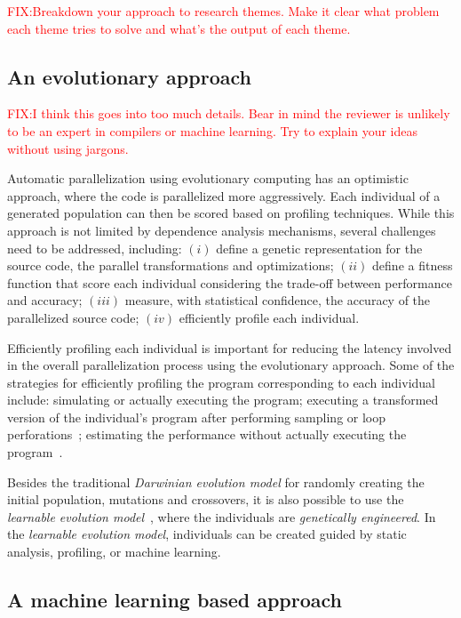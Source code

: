 \documentclass[a4paper,12pt]{article}
\newcommand\FIXME[1]{\textcolor{red}{FIX:}\textcolor{red}{#1}}
\begin{document}
\FIXME{Breakdown your approach to research themes. Make it 
clear what problem each theme tries to solve and what's the
output of each theme.}

\subsection{An evolutionary approach}
\FIXME{I think this goes into too much details. Bear in mind
the reviewer is unlikely to be an expert in compilers or machine learning.
Try to explain your ideas without using jargons. 
}

Automatic parallelization using evolutionary computing has an optimistic
approach, where the code is parallelized more aggressively.  Each individual of
a generated population can then be scored based on profiling techniques.  While
this approach is not limited by dependence analysis mechanisms, several
challenges need to be addressed, including: $(i)$ define a genetic
representation for the source code, the parallel transformations and
optimizations; $(ii)$ define a fitness function that score each individual
considering the trade-off between performance and accuracy; $(iii)$ measure,
with statistical confidence, the accuracy of the parallelized source code;
$(iv)$ efficiently profile each individual.

Efficiently profiling each individual is important for reducing the latency
involved in the overall parallelization process using the evolutionary
approach.  Some of the strategies for efficiently profiling the program
corresponding to each individual include: simulating or actually executing the
program; executing a transformed version of the individual's program after
performing sampling or loop perforations~\cite{douskos11,misailovic11,zhu12};
estimating the performance without actually executing the
program~\cite{fahringer95b,fahringer00,fahringer11}.

Besides the traditional {\em Darwinian evolution model} for randomly creating
the initial population, mutations and crossovers, it is also possible to use
the {\em learnable evolution model}~\cite{michalski00,cervone00}, where the
individuals are {\em genetically engineered}. In the {\em learnable evolution
model}, individuals can be created guided by static analysis, profiling, or
machine learning.

\subsection{A machine learning based approach}
\end{document}
